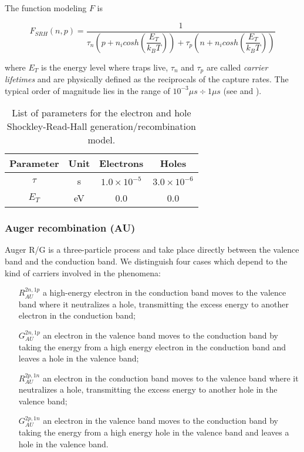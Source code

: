 The function modeling $F$ is

\begin{equation}
F_{SRH}(n,p) = \dfrac{1}{\tau_n\left(p+n_i cosh\left(\dfrac{E_T}{k_BT} \right) \right)+\tau_p\left(n+n_i cosh\left(\dfrac{E_T}{k_BT}\right) \right)}
\end{equation}

where $E_T$ is the energy level where traps live, $\tau_n$ and $\tau_p$ are called \textit{carrier lifetimes} and are physically defined as the reciprocals of the capture rates. The typical order of magnitude lies in the range of $10^{-3}\mu s\div 1 \mu s$ (see  \cite{VanOver:SRH} and \cite{Goebel:SRH}). 

\begin{table}[!h]
\centering
\begin{tabular}{cccc}
\toprule
Parameter & Unit & Electrons & Holes \\
\midrule
$\tau$ & s & $1.0\times 10^{-5}$ & $3.0 \times 10^{-6}$\\
$E_T$ & eV & 0.0 & 0.0\\
\bottomrule
\end{tabular}
\caption{List of parameters for the electron and hole Shockley-Read-Hall generation/recombination model.}
\end{table}

\subsubsection{Auger recombination (AU)}

Auger R/G is a three-particle process and take place directly between the valence band and the conduction band. We distinguish four cases which depend to the kind of carriers involved in the phenomena:
\begin{itemize}
\item[$R_{AU}^{2n,1p}$] a high-energy electron in the conduction band moves to the valence band where it neutralizes a hole, transmitting the excess energy to another electron in the conduction band;
\item[$G_{AU}^{2n,1p}$] an electron in the valence band moves to the conduction band by taking the energy from a high energy electron in the conduction band and leaves a hole in the valence band;
\item[$R_{AU}^{2p,1n}$] an electron in the conduction band moves to the valence band where it neutralizes a hole, transmitting the excess energy to another hole in the valence band;
\item[$G_{AU}^{2p,1n}$] an electron in the valence band moves to the conduction band by taking the energy from a high energy hole in the valence band and leaves a hole in the valence band.
\end{itemize}

